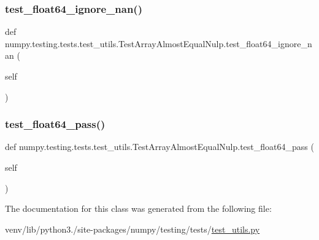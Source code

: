 \subsubsection{\texorpdfstring{test\+\_\+float64\+\_\+ignore\+\_\+nan()}{test\_float64\_ignore\_nan()}}
{\footnotesize\ttfamily def numpy.\+testing.\+tests.\+test\+\_\+utils.\+Test\+Array\+Almost\+Equal\+Nulp.\+test\+\_\+float64\+\_\+ignore\+\_\+nan (\begin{DoxyParamCaption}\item[{}]{self }\end{DoxyParamCaption})}

\mbox{\label{classnumpy_1_1testing_1_1tests_1_1test__utils_1_1TestArrayAlmostEqualNulp_a08641f0c857b759746d1694ade26a259}} 
\subsubsection{\texorpdfstring{test\+\_\+float64\+\_\+pass()}{test\_float64\_pass()}}
{\footnotesize\ttfamily def numpy.\+testing.\+tests.\+test\+\_\+utils.\+Test\+Array\+Almost\+Equal\+Nulp.\+test\+\_\+float64\+\_\+pass (\begin{DoxyParamCaption}\item[{}]{self }\end{DoxyParamCaption})}



The documentation for this class was generated from the following file\+:\begin{DoxyCompactItemize}
\item 
venv/lib/python3./site-\/packages/numpy/testing/tests/\hyperlink{numpy_2testing_2tests_2test__utils_8py}{test\+\_\+utils.\+py}\end{DoxyCompactItemize}

